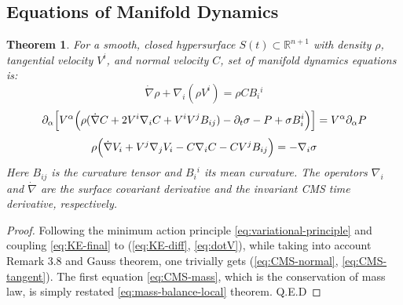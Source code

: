 \documentclass[11pt]{article}
\theoremstyle{definition}
\theoremstyle{plain}
\newtheorem{theorem}[definition]{Theorem}
\theoremstyle{remark}
\begin{document}
\subsection{Equations of Manifold Dynamics}\label{subsec:unified-eom}
\begin{theorem}
For a smooth, closed hypersurface $S(t)\subset\mathbb{R}^{n+1}$ with density $\rho$, tangential velocity $V^i$, and normal velocity $C$, set of manifold dynamics equations is:
\begin{equation}
\dot{\nabla}\rho + \nabla_i (\rho V^i)=\rho CB_i{}^{i}
\label{eq:CMS-mass}
\end{equation}
\begin{equation}
\partial_\alpha \Bigl[V^\alpha\Bigl(\rho(\dot{\nabla} C + 2V^i\nabla_i C + V^iV^j B_{ij})-\partial_t\sigma-P+\sigma B_i^i\Bigr)\Bigr]=V^\alpha\partial_\alpha P
\label{eq:CMS-normal}
\end{equation}
\begin{equation}
\rho\Bigl(\dot{\nabla}V_i + V^j\nabla_j V_i - C\nabla_i C - CV^j B_{ij}\Bigr)
= -\nabla_i\sigma
\label{eq:CMS-tangent}
\end{equation}
Here $B_{ij}$ is the curvature tensor and $B_i{}^{i}$ its mean curvature. The operators $\nabla_i$ and $\dot{\nabla}$ are the surface covariant derivative and the invariant CMS time derivative, respectively.
\end{theorem}
\begin{proof}
Following the minimum action principle \eqref{eq:variational-principle} and coupling \eqref{eq:KE-final} to (\ref{eq:KE-diff}, \ref{eq:dotV}), while taking into account Remark 3.8 and Gauss theorem, one trivially gets (\ref{eq:CMS-normal}, \ref{eq:CMS-tangent}). The first equation \eqref{eq:CMS-mass}, which is the conservation of mass law, is simply restated \eqref{eq:mass-balance-local} theorem. Q.E.D 
\end{proof}
\end{document}
